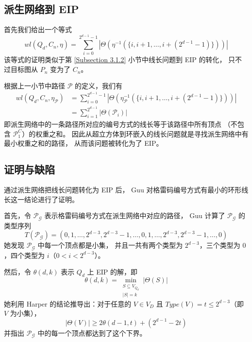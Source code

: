\subsection{派生网络到 EIP}
\label{Subsection 3.2.2}

首先我们给出一个等式
\begin{equation}
wl(Q_d, C_n, \eta) = \sum_{i = 0}^{2^{d - 1} - 1}
|\Theta(\eta^{-1}(\{i, i + 1, \dots, i + (2^{d - 1} - 1)\}))|
\end{equation}
该等式的证明类似于第 \ref{Subsection 3.1.2} 小节中线长问题到 EIP 的转化，
只不过目标图从 $P_n$ 变为了 $C_n$。

根据上一小节中路径 $\mathcal{P}$ 的定义，我们有
\begin{align}
wl(Q_d, C_n, \eta_\mathcal{P}) & = \sum_{i = 0}^{2^{d - 1} - 1}
				   |\Theta(\eta_\mathcal{P}^{-1}(\{i, i + 1, \dots, i + (2^{d - 1} - 1)\}))| \\
			       & = \sum_{i = 1}^{2^{d - 1}} |\Theta(\mathcal{P}_i)|
\end{align}
即派生网络中的一条路径所对应的编号方式的线长等于该路径中所有顶点
（不包含 $\mathcal{P}_1^C$）的权重之和。
因此从超立方体到环嵌入的线长问题就是寻找派生网络中有最小权重之和的路径，
从而该问题被转化为了 EIP。

\subsection{证明与缺陷}
\label{Subsection 3.2.3}

通过派生网络把线长问题转化为 EIP 后，
Guu 对格雷码编号方式有最小的环形线长这一结论进行了证明。

首先，令 $\mathcal{P}_\mathcal{G}$ 表示格雷码编号方式在派生网络中对应的路径，
Guu 计算了 $\mathcal{P}_\mathcal{G}$ 的类型序列
\begin{equation}
T(\mathcal{P}_\mathcal{G}) = (0, 1, \dots, 2^{d - 3}, 2^{d - 3} - 1, \dots, 0, 1, \dots, 2^{d - 3}, 2^{d - 3} - 1, \dots, 0)
\end{equation}
她发现 $\mathcal{P}_\mathcal{G}$ 中每一个顶点都是小集，
并且一共有两个类型为 $2^{d - 3}$，三个类型为 $0$，四个类型为 $i$（$0 < i <2^{d - 3}$）。

然后，令 $\theta(d, k)$ 表示 $Q_d$ 上 EIP 的解，即
\begin{equation}
\theta(d, k) = \min_{\substack{
	S \subseteq V_{Q_d} \\
	|S| = k
}} |\Theta(S)|
\end{equation}
她利用 Harper 的结论推导出：对于任意的 $V \in V_D$ 且 $Type(V) = t \le 2^{d - 3}$（即 $V$ 为小集），
\begin{equation}
|\Theta(V)| \ge 2 \theta(d - 1, t) + (2^{d - 1} - 2 t)
\end{equation}
并指出 $\mathcal{P}_\mathcal{G}$ 中的每一个顶点都达到了这个下界。

